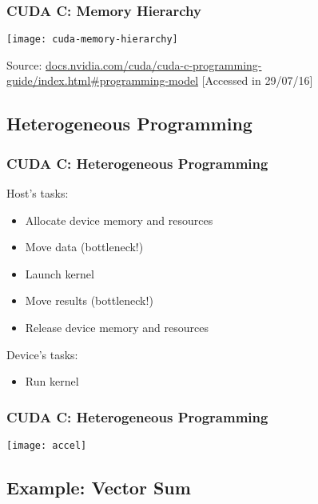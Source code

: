 \documentclass[10pt, compress]{beamer}
\begin{document}
\begin{frame}
    \frametitle{CUDA C: Memory Hierarchy}
    \begin{center}
        \texttt{[image: cuda-memory-hierarchy]}
    \end{center}

    \vfill

    \begin{center}
        \tiny{Source: \url{docs.nvidia.com/cuda/cuda-c-programming-guide/index.html\#programming-model} [Accessed in 29/07/16]}
    \end{center}
\end{frame}

\subsection{Heterogeneous Programming}

\begin{frame}
    \frametitle{CUDA C: Heterogeneous Programming}
    \alert{Host}'s tasks:
    \begin{itemize}
        \item Allocate \alert{device} memory and resources
        \item Move \alert{data} (\alert{bottleneck!})

        \item Launch kernel

        \item Move \alert{results} (\alert{bottleneck!})
        \item Release \alert{device} memory and resources
    \end{itemize}

    \alert{Device}'s tasks:
    \begin{itemize}
        \item Run kernel
    \end{itemize}
\end{frame}

\begin{frame}
    \frametitle{CUDA C: Heterogeneous Programming}
    \centering
    \texttt{[image: accel]}
\end{frame}

\subsection{Example: Vector Sum}
\end{document}
